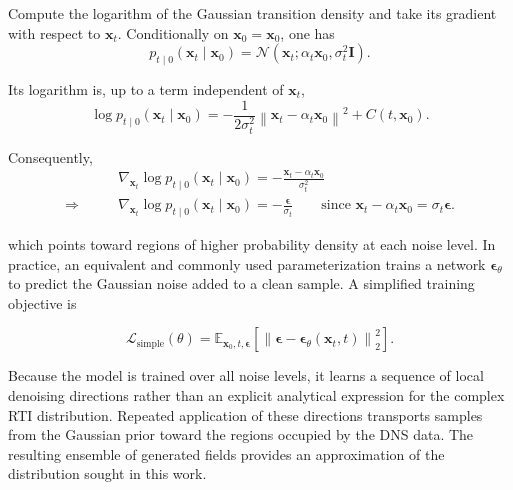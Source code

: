 \begin{compactproof}[title={Proof}]
Compute the logarithm of the Gaussian transition density and take its gradient with respect to $\mathbf{x}_t$.
Conditionally on $\mathbf{x}_0=\mathbf{x}_0$, one has
\begin{equation*}
p_{t\mid 0}(\mathbf{x}_t\mid\mathbf{x}_0)
=
\mathcal{N}
\left(
\mathbf{x}_t;
\alpha_t\mathbf{x}_0,
\sigma_t^2\mathbf{I}
\right).
\end{equation*}

Its logarithm is, up to a term independent of $\mathbf{x}_t$,
\begin{equation*}
\log p_{t\mid 0}(\mathbf{x}_t\mid\mathbf{x}_0)
=
-\frac{1}{2\sigma_t^2}
\left\|
\mathbf{x}_t-\alpha_t\mathbf{x}_0
\right\|^2
+
C(t,\mathbf{x}_0).
\end{equation*}

Consequently,
\begin{align*}
&\nabla_{\mathbf{x}_t}
\log p_{t\mid 0}(\mathbf{x}_t\mid\mathbf{x}_0)
=
-\frac{
\mathbf{x}_t-\alpha_t\mathbf{x}_0
}{
\sigma_t^2
}
\\
\Rightarrow\qquad
&
\boxed{
\nabla_{\mathbf{x}_t}
\log p_{t\mid 0}(\mathbf{x}_t\mid\mathbf{x}_0)
=
-\frac{\boldsymbol{\epsilon}}{\sigma_t}
}
\qquad
{\scriptstyle
\text{since }
\mathbf{x}_t-\alpha_t\mathbf{x}_0
=
\sigma_t\boldsymbol{\epsilon}.
}
\end{align*}

\end{compactproof}



which points toward regions of higher probability density at each noise level.
In practice, an equivalent and commonly used parameterization trains a network
$\boldsymbol{\epsilon}_{\theta}$ to predict the Gaussian noise added to a clean
sample. A simplified training objective is

\begin{equation}
    \mathcal{L}_{\mathrm{simple}}(\theta)
    =
    \mathbb{E}_{\mathbf{x}_0,t,\boldsymbol{\epsilon}}
    \left[
        \left\|
        \boldsymbol{\epsilon}
        -
        \boldsymbol{\epsilon}_{\theta}(\mathbf{x}_t,t)
        \right\|_2^2
    \right].
\end{equation}

Because the model is trained over all noise levels, it learns a sequence of
local denoising directions rather than an explicit analytical expression for
the complex RTI distribution. Repeated application of these directions
transports samples from the Gaussian prior toward the regions occupied by the
DNS data. The resulting ensemble of generated fields provides an approximation
of the distribution sought in this work.

